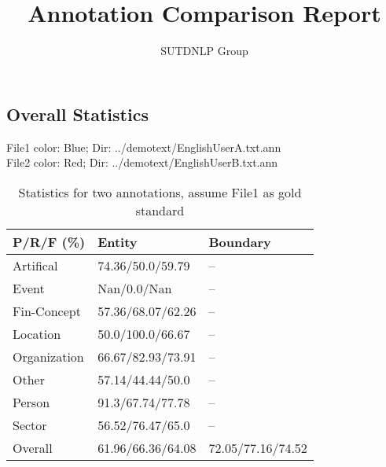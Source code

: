 \documentclass[runningheads,a4paper]{llncs}
\begin{document}
\begin{CJK*}{UTF8}{gbsn}
\mainmatter  %
\title{Annotation Comparison Report}
\author{SUTDNLP Group}
\maketitle

\section{Overall Statistics}
File1 color: \colorbox{blue!30}{Blue}; Dir: \colorbox{blue!30}{../demotext/EnglishUserA.txt.ann}\\
File2 color: \colorbox{red!30}{Red}; Dir: \colorbox{red!30}{../demotext/EnglishUserB.txt.ann}\\
\begin{table}[!htbp]
\centering
\caption{Statistics for two annotations, assume File1 as gold standard}
\begin{tabular}{l|l|l}
\hline
P/R/F (\%)& Entity &Boundary\\
\hline
Artifical& 74.36/50.0/59.79 &--\\
Event& Nan/0.0/Nan &--\\
Fin-Concept& 57.36/68.07/62.26 &--\\
Location& 50.0/100.0/66.67 &--\\
Organization& 66.67/82.93/73.91 &--\\
Other& 57.14/44.44/50.0 &--\\
Person& 91.3/67.74/77.78 &--\\
Sector& 56.52/76.47/65.0 &--\\
\hline
Overall& 61.96/66.36/64.08 &72.05/77.16/74.52\\
\hline
\end{tabular}
\end{table}

\end{CJK*}
\end{document}
